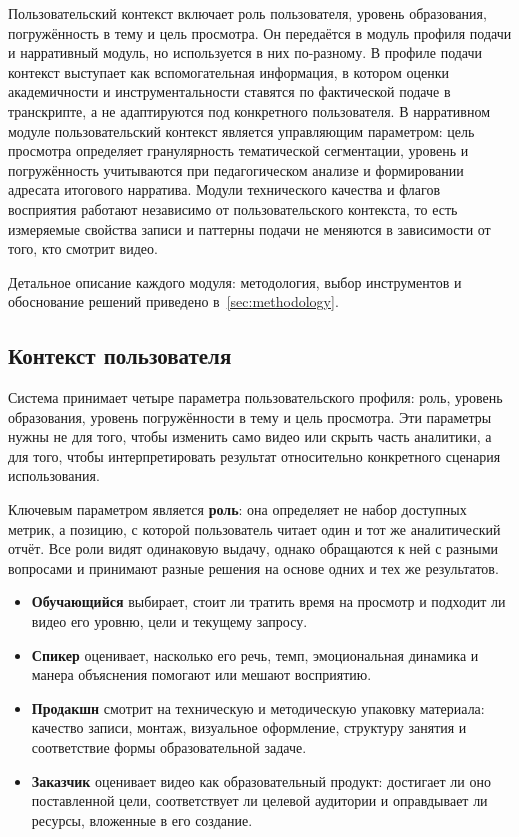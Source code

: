 Пользовательский контекст включает роль пользователя, уровень образования,
погружённость в тему и цель просмотра.
Он передаётся в модуль профиля подачи и нарративный модуль, но используется
в них по-разному. В профиле подачи контекст выступает как вспомогательная
информация, в котором оценки академичности и инструментальности ставятся по фактической
подаче в транскрипте, а не адаптируются под конкретного пользователя.
В нарративном модуле пользовательский контекст является управляющим параметром:
цель просмотра определяет гранулярность тематической сегментации, уровень и
погружённость учитываются при педагогическом анализе и формировании адресата
итогового нарратива. Модули технического качества и флагов восприятия работают
независимо от пользовательского контекста, то есть измеряемые свойства записи и паттерны
подачи не меняются в зависимости от того, кто смотрит видео.

Детальное описание каждого модуля: методология, выбор инструментов
и обоснование решений приведено в~\cref{sec:methodology}.


\subsection{Контекст пользователя}
\label{subsec:user-context}

Система принимает четыре параметра пользовательского профиля:
роль, уровень образования, уровень погружённости в тему и цель просмотра.
Эти параметры нужны не для того, чтобы изменить само видео или скрыть часть
аналитики, а для того, чтобы интерпретировать результат относительно
конкретного сценария использования.

Ключевым параметром является \textbf{роль}: она определяет не набор доступных
метрик, а позицию, с которой пользователь читает один и тот же аналитический
отчёт. Все роли видят одинаковую выдачу, однако обращаются к ней с разными
вопросами и принимают разные решения на основе одних и тех же результатов.

\begin{itemize}
    \item \textbf{Обучающийся} выбирает, стоит ли тратить время на просмотр
    и подходит ли видео его уровню, цели и текущему запросу.

    \item \textbf{Спикер} оценивает, насколько его речь, темп,
    эмоциональная динамика и манера объяснения помогают или мешают восприятию.

    \item \textbf{Продакшн} смотрит на техническую и методическую упаковку
    материала: качество записи, монтаж, визуальное оформление,
    структуру занятия и соответствие формы образовательной задаче.

    \item \textbf{Заказчик} оценивает видео как образовательный продукт:
    достигает ли оно поставленной цели, соответствует ли целевой аудитории
    и оправдывает ли ресурсы, вложенные в его создание.
\end{itemize}


